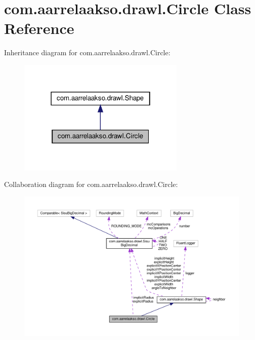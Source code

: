 \hypertarget{classcom_1_1aarrelaakso_1_1drawl_1_1_circle}{}\section{com.\+aarrelaakso.\+drawl.\+Circle Class Reference}
\label{classcom_1_1aarrelaakso_1_1drawl_1_1_circle}


Inheritance diagram for com.\+aarrelaakso.\+drawl.\+Circle\+:\nopagebreak
\begin{figure}[H]
\begin{center}
\leavevmode
\includegraphics[width=226pt]{classcom_1_1aarrelaakso_1_1drawl_1_1_circle__inherit__graph}
\end{center}
\end{figure}


Collaboration diagram for com.\+aarrelaakso.\+drawl.\+Circle\+:\nopagebreak
\begin{figure}[H]
\begin{center}
\leavevmode
\includegraphics[width=350pt]{classcom_1_1aarrelaakso_1_1drawl_1_1_circle__coll__graph}
\end{center}
\end{figure}
